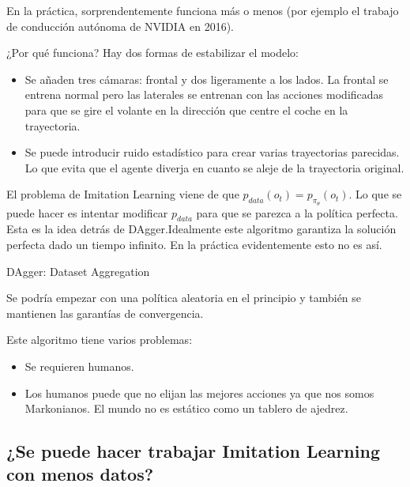 En la práctica, sorprendentemente funciona más o menos (por ejemplo el trabajo de
conducción autónoma de NVIDIA en 2016). 

¿Por qué funciona? Hay dos formas de estabilizar el modelo:
\begin{itemize}
    \item Se añaden tres cámaras: frontal y dos ligeramente a los lados. La frontal se entrena
        normal pero las laterales se entrenan con las acciones modificadas para que se gire el
        volante en la dirección que centre el coche en la trayectoria.
    \item Se puede introducir ruido estadístico para crear varias trayectorias
        parecidas. Lo que evita que el agente diverja en cuanto se aleje de la trayectoria
        original.
\end{itemize}

El problema de Imitation Learning viene de que
$p_{data}(o_t)=p_{\pi_\theta}(o_t)$. Lo que se puede hacer es intentar modificar $p_{data}$
para que se parezca a la política perfecta. Esta es la idea detrás de DAgger.Idealmente este
algoritmo garantiza la solución perfecta dado un tiempo infinito. En la práctica
evidentemente esto no es así.

\begin{algorithm}
    \caption{DAgger: Dataset Aggregation}
\end{algorithm}

Se podría empezar con una política aleatoria en el principio y también se mantienen las
garantías de convergencia.

Este algoritmo tiene varios problemas:
\begin{itemize}
    \item Se requieren humanos.
    \item Los humanos puede que no elijan las mejores acciones ya que nos somos Markonianos. El
        mundo no es estático como un tablero de ajedrez.
\end{itemize}

\subsection{¿Se puede hacer trabajar Imitation Learning con menos datos?}%
\label{sub:_se_puede_hacer_trabajar_imitation_learning_con_menos_datos_}

